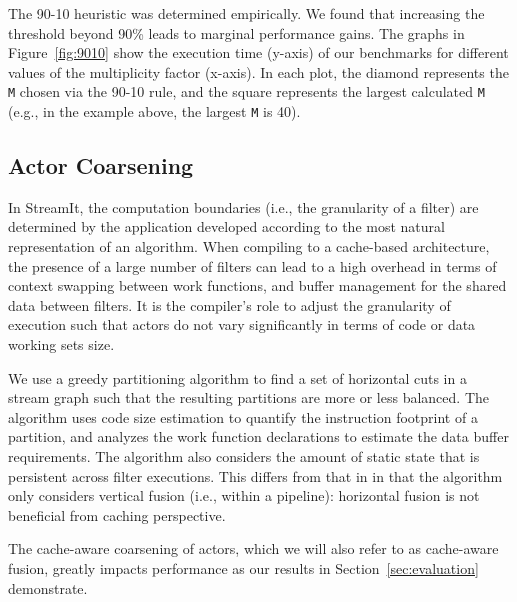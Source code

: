 The 90-10 heuristic was determined empirically. We found that
increasing the threshold beyond 90\% leads to marginal
performance gains. The graphs in Figure~\ref{fig:9010} show the
execution time (y-axis) of our benchmarks for different values of the multiplicity
factor (x-axis). In each plot, the diamond represents the \texttt{M} chosen via
the 90-10 rule, and the square represents the largest calculated
\texttt{M} (e.g., in the example above, the largest \texttt{M} is 40).

\subsection{Actor Coarsening}

In StreamIt, the computation boundaries (i.e., the granularity of a
filter) are determined by the application developed according to the
most natural representation of an algorithm. When compiling to a
cache-based architecture, the presence of a  large number of filters
can lead to a high overhead in terms of context swapping between work
functions, and buffer management for the shared data between filters.
It is the compiler's role to adjust the granularity of execution such
that actors do not vary significantly in terms of code  or data
working sets size.

We use a greedy partitioning algorithm to find a set of horizontal cuts
in a stream graph such that the resulting partitions are more or less
balanced. The algorithm uses code size estimation to quantify the
instruction footprint of a partition, and analyzes the work function
declarations to estimate the data buffer requirements. The algorithm
also considers the amount of static state that is persistent across
filter executions. This differs from that in
\cite{streamit-asplos} in that the algorithm
only considers vertical fusion (i.e., within a pipeline): horizontal
fusion is not beneficial from caching perspective.  

The cache-aware coarsening of actors, which we will also refer to as
cache-aware fusion, greatly impacts performance as
our results in Section~\ref{sec:evaluation} demonstrate.